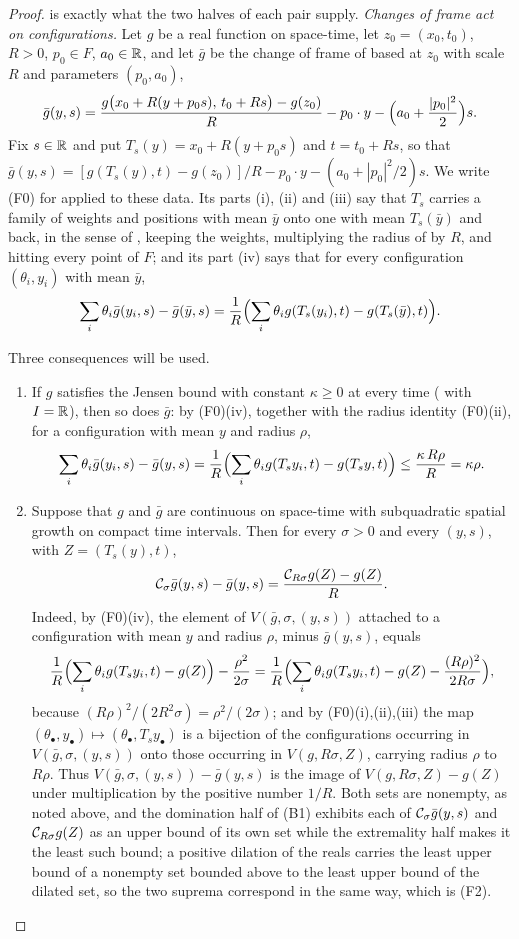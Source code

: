 \begin{proof}
is exactly what the two halves of each pair supply.
\emph{Changes of frame act on configurations.} Let $g$ be a real function on
space-time, let $z_0=(x_0,t_0)$, $R>0$, $p_0\in F$, $a_0\in\mathbb{R}$, and let $\bar g$
be the change of frame of  based at $z_0$ with scale $R$
and parameters $(p_0,a_0)$,
\[
  \bar g(y,s)=\frac{g\bigl(x_0+R(y+p_0s),\,t_0+Rs\bigr)-g(z_0)}{R}
     -p_0\cdot y-\Bigl(a_0+\frac{|p_0|^2}{2}\Bigr)s .
\]
Fix $s\in\mathbb{R}$ and put $T_s(y)=x_0+R(y+p_0s)$ and $t=t_0+Rs$, so that
$\bar g(y,s)=[g(T_s(y),t)-g(z_0)]/R-p_0\cdot y-(a_0+|p_0|^2/2)s$. We write
(F0) for  applied to these data. Its parts (i),
(ii) and (iii) say that $T_s$ carries a family of weights and positions with
mean $\bar y$ onto one with mean $T_s(\bar y)$ and back, in the sense of
, keeping the weights, multiplying the radius of
 by $R$, and hitting every point of $F$; and its part (iv)
says that for every configuration $(\theta_i,y_i)$ with mean $\bar y$,
\[
  \sum_i\theta_i\bar g(y_i,s)-\bar g(\bar y,s)
    =\frac1R\Bigl(\sum_i\theta_ig(T_s(y_i),t)-g(T_s(\bar y),t)\Bigr).
\]

Three consequences will be used.
\begin{enumerate}
\item[(F1)] If $g$ satisfies the Jensen bound with constant $\kappa\ge0$ at
every time ( with $I=\mathbb{R}$), then so does $\bar g$: by
(F0)(iv), together with the radius identity (F0)(ii), for a configuration with
mean $y$ and radius $\rho$,
\[
  \sum_i\theta_i\bar g(y_i,s)-\bar g(y,s)
   =\frac1R\Bigl(\sum_i\theta_ig(T_sy_i,t)-g(T_sy,t)\Bigr)
   \le\frac{\kappa\,R\rho}{R}=\kappa\rho .
\]
\item[(F2)] Suppose that $g$ and $\bar g$ are continuous on space-time with
subquadratic spatial growth on compact time intervals. Then for every $\sigma>0$
and every $(y,s)$, with $Z=(T_s(y),t)$,
\[
  \mathcal{C}_\sigma\bar g(y,s)-\bar g(y,s)
    =\frac{\mathcal{C}_{R\sigma}g(Z)-g(Z)}{R}.
\]
Indeed, by (F0)(iv), the element of $V(\bar g,\sigma,(y,s))$ attached to a
configuration with mean $y$ and radius $\rho$, minus $\bar g(y,s)$, equals
\[
  \frac1R\Bigl(\sum_i\theta_ig(T_sy_i,t)-g(Z)\Bigr)-\frac{\rho^2}{2\sigma}
   =\frac1R\Bigl(\sum_i\theta_ig(T_sy_i,t)-g(Z)
       -\frac{(R\rho)^2}{2R\sigma}\Bigr),
\]
because $(R\rho)^2/(2R^2\sigma)=\rho^2/(2\sigma)$; and by (F0)(i),(ii),(iii) the
map
$(\theta_\bullet,y_\bullet)\mapsto(\theta_\bullet,T_sy_\bullet)$ is a bijection
of the configurations occurring in $V(\bar g,\sigma,(y,s))$ onto those occurring
in $V(g,R\sigma,Z)$, carrying radius $\rho$ to $R\rho$. Thus
$V(\bar g,\sigma,(y,s))-\bar g(y,s)$ is the image of
$V(g,R\sigma,Z)-g(Z)$ under multiplication by the positive number $1/R$. Both
sets are nonempty, as noted above, and the domination half of (B1) exhibits
each of $\mathcal{C}_\sigma\bar g(y,s)$ and $\mathcal{C}_{R\sigma}g(Z)$ as an upper bound of
its own set while the extremality half makes it the least such bound; a positive
dilation of the reals carries the least upper bound of a nonempty set bounded
above to the least upper bound of the dilated set, so the two suprema correspond
in the same way, which is (F2).


\end{enumerate}
\end{proof}
